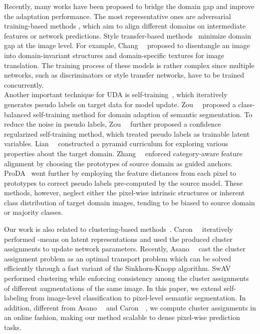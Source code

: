 \documentclass[10pt,twocolumn,letterpaper]{article}
\begin{document}
	 Recently, many works have been proposed to bridge the domain gap and improve the adaptation performance. The most representative ones are adversarial training-based methods \cite{kim2020learning,hong2018conditional,pan2020unsupervised,tsai2018learning,tsai2019domain}, which aim to align different domains on intermediate features or network predictions. Style transfer-based methods~\cite{chang2019all,chen2019crdoco,choi2019self,wu2018dcan,yang2020fda} minimize domain gap at the image level. For example, Chang~\etal~\cite{chang2019all} proposed to disentangle an image into domain-invariant structures and domain-specific textures for image translation. The training process of these models is rather complex since multiple networks, such as discriminators or style transfer networks, have to be trained concurrently.\\
	\indent Another important technique for UDA is self-training~\cite{zou2018domain,zou2019confidence,lian2019constructing,zhang2019category,melas2021pixmatch,li2021t}, which iteratively generates pseudo labels on target data for model update. Zou~\etal~\cite{zou2018domain} proposed a class-balanced self-training method for domain adaption of semantic segmentation. To reduce the noise in pseudo labels, Zou~\etal~\cite{zou2019confidence} further proposed a confidence regularized self-training method, which treated pseudo labels as trainable latent variables. Lian~\etal~\cite{lian2019constructing} constructed a pyramid curriculum for exploring various properties about the target domain. Zhang~\etal~\cite{zhang2019category} enforced category-aware feature alignment by choosing the prototypes of source domain as guided anchors. ProDA~\cite{zhang2021prototypical} went further by employing the feature distances from each pixel to prototypes to correct pseudo labels pre-computed by the source model. These methods, however, neglect either the pixel-wise intrinsic structures or inherent class distribution of target domain images, tending to be biased to source domain or majority classes.


	 Our work is also related to clustering-based methods~\cite{asano2020self,bautista2016cliquecnn,caron2018deep,huang2019unsupervised,xie2016unsupervised,yan2020clusterfit,yang2016joint,zhuang2019local,asano2020labelling}. Caron~\etal~\cite{caron2018deep} iteratively performed -means on latent representations and used the produced cluster assignments to update network parameters. Recently, Asano~\etal~\cite{asano2020self} cast the cluster assignment problem as an optimal transport problem which can be solved efficiently through a fast variant of the Sinkhorn-Knopp algorithm. SwAV~\cite{caron2020unsupervised} performed clustering while enforcing consistency among the cluster assignments of different augmentations of the same image. In this paper, we extend self-labeling from image-level classification to pixel-level semantic segmentation. In addition, different from Asano~\etal~\cite{asano2020self} and Caron~\etal~\cite{caron2018deep}, we compute cluster assignments in an online fashion, making our method scalable to dense pixel-wise prediction tasks. 
\end{document}
